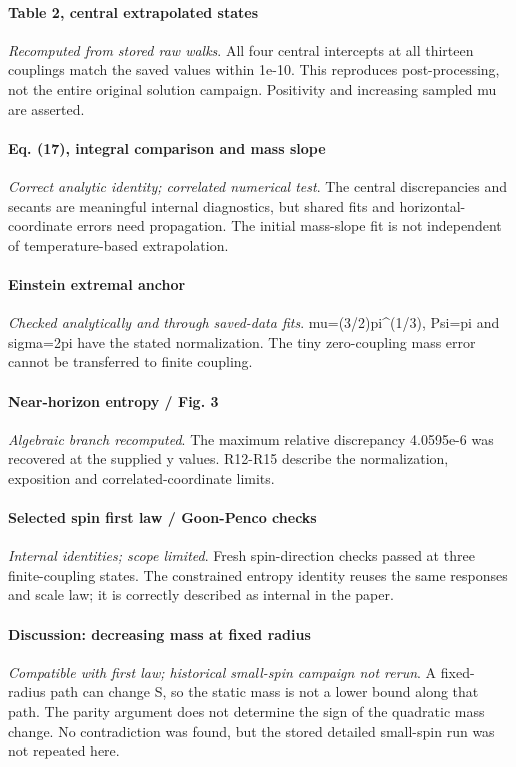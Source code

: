 \documentclass[10pt,a4paper]{article}
\begin{document}
\paragraph{Table 2, central extrapolated states} \textit{Recomputed from stored raw walks}. All four central intercepts at all thirteen couplings match the saved values within 1e-10. This reproduces post-processing, not the entire original solution campaign. Positivity and increasing sampled mu are asserted.

\paragraph{Eq. (17), integral comparison and mass slope} \textit{Correct analytic identity; correlated numerical test}. The central discrepancies and secants are meaningful internal diagnostics, but shared fits and horizontal-coordinate errors need propagation. The initial mass-slope fit is not independent of temperature-based extrapolation.

\paragraph{Einstein extremal anchor} \textit{Checked analytically and through saved-data fits}. mu=(3/2)pi\textasciicircum{}(1/3), Psi=pi and sigma=2pi have the stated normalization. The tiny zero-coupling mass error cannot be transferred to finite coupling.

\paragraph{Near-horizon entropy / Fig. 3} \textit{Algebraic branch recomputed}. The maximum relative discrepancy 4.0595e-6 was recovered at the supplied y values. R12-R15 describe the normalization, exposition and correlated-coordinate limits.

\paragraph{Selected spin first law / Goon-Penco checks} \textit{Internal identities; scope limited}. Fresh spin-direction checks passed at three finite-coupling states. The constrained entropy identity reuses the same responses and scale law; it is correctly described as internal in the paper.

\paragraph{Discussion: decreasing mass at fixed radius} \textit{Compatible with first law; historical small-spin campaign not rerun}. A fixed-radius path can change S, so the static mass is not a lower bound along that path. The parity argument does not determine the sign of the quadratic mass change. No contradiction was found, but the stored detailed small-spin run was not repeated here.
\end{document}
